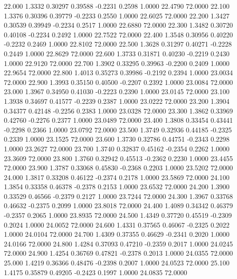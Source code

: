   22.000   1.3332   0.30297   0.39588  -0.2231   0.2598   1.0000  22.4790  72.0000
  22.100   1.3376   0.30396   0.39779  -0.2233   0.2550   1.0000  22.6025  72.0000
  22.200   1.3427   0.30539   0.39949  -0.2234   0.2517   1.0000  22.6880  72.0000
  22.300   1.3482   0.30720   0.40108  -0.2234   0.2492   1.0000  22.7522  72.0000
  22.400   1.3548   0.30956   0.40220  -0.2232   0.2469   1.0000  22.8102  72.0000
  22.500   1.3628   0.31297   0.40271  -0.2228   0.2449   1.0000  22.8629  72.0000
  22.600   1.3733   0.31871   0.40230  -0.2219   0.2430   1.0000  22.9120  72.0000
  22.700   1.3902   0.33295   0.39963  -0.2200   0.2409   1.0000  22.9654  72.0000
  22.800   1.4013   0.35273   0.39986  -0.2192   0.2394   1.0000  23.0034  72.0000
  22.900   1.3993   0.35150   0.40500  -0.2207   0.2392   1.0000  23.0084  72.0000
  23.000   1.3967   0.34950   0.41030  -0.2223   0.2390   1.0000  23.0145  72.0000
  23.100   1.3938   0.34697   0.41577  -0.2239   0.2387   1.0000  23.0222  72.0000
  23.200   1.3904   0.34377   0.42148  -0.2256   0.2383   1.0000  23.0328  72.0000
  23.300   1.3862   0.33969   0.42760  -0.2276   0.2377   1.0000  23.0489  72.0000
  23.400   1.3808   0.33454   0.43441  -0.2298   0.2366   1.0000  23.0792  72.0000
  23.500   1.3749   0.32936   0.44185  -0.2325   0.2339   1.0000  23.1525  72.0000
  23.600   1.3730   0.32786   0.44751  -0.2343   0.2298   1.0000  23.2627  72.0000
  23.700   1.3740   0.32837   0.45162  -0.2354   0.2262   1.0000  23.3609  72.0000
  23.800   1.3760   0.32942   0.45513  -0.2362   0.2230   1.0000  23.4455  72.0000
  23.900   1.3787   0.33068   0.45830  -0.2368   0.2203   1.0000  23.5202  72.0000
  24.000   1.3817   0.33208   0.46122  -0.2374   0.2178   1.0000  23.5869  72.0000
  24.100   1.3854   0.33358   0.46378  -0.2378   0.2153   1.0000  23.6532  72.0000
  24.200   1.3900   0.33529   0.46566  -0.2379   0.2127   1.0000  23.7244  72.0000
  24.300   1.3967   0.33768   0.46632  -0.2375   0.2099   1.0000  23.8018  72.0000
  24.400   1.4089   0.34342   0.46379  -0.2357   0.2065   1.0000  23.8935  72.0000
  24.500   1.4349   0.37720   0.45519  -0.2309   0.2024   1.0000  24.0052  72.0000
  24.600   1.4331   0.37565   0.46067  -0.2325   0.2022   1.0000  24.0104  72.0000
  24.700   1.4309   0.37355   0.46629  -0.2341   0.2020   1.0000  24.0166  72.0000
  24.800   1.4284   0.37093   0.47210  -0.2359   0.2017   1.0000  24.0245  72.0000
  24.900   1.4254   0.36769   0.47821  -0.2378   0.2013   1.0000  24.0355  72.0000
  25.000   1.4219   0.36366   0.48476  -0.2398   0.2007   1.0000  24.0523  72.0000
  25.100   1.4175   0.35879   0.49205  -0.2423   0.1997   1.0000  24.0835  72.0000
